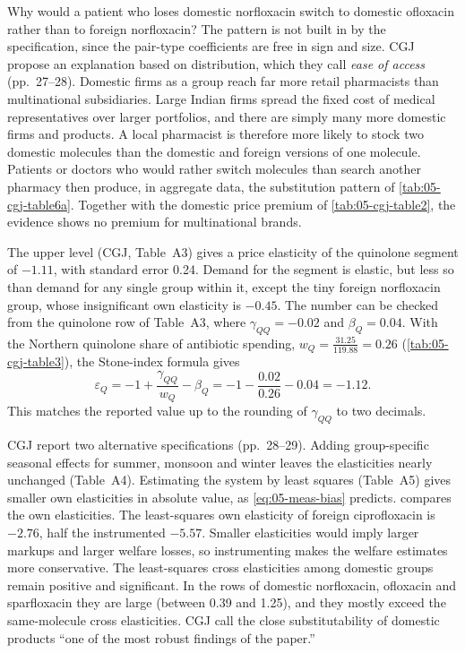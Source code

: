  Why would a patient who loses domestic norfloxacin switch to domestic ofloxacin rather
than to foreign norfloxacin? The pattern is not built in by the specification, since the pair-type coefficients are
free in sign and size. CGJ propose an explanation based on distribution, which they call \emph{ease of access}
(pp.~27--28). Domestic firms as a group reach far more retail pharmacists than multinational subsidiaries. Large
Indian firms spread the fixed cost of medical representatives over larger portfolios, and there are simply many more
domestic firms and products. A local pharmacist is therefore more likely to stock two domestic molecules than the
domestic and foreign versions of one molecule. Patients or doctors who would rather switch molecules than search
another pharmacy then produce, in aggregate data, the substitution pattern of \cref{tab:05-cgj-table6a}. Together with
the domestic price premium of \cref{tab:05-cgj-table2}, the evidence shows no premium for multinational brands.

 The upper level (CGJ, Table~A3) gives a price elasticity of the quinolone segment
of $-1.11$, with standard error 0.24. Demand for the segment is elastic, but less so than demand for any single group
within it, except the tiny foreign norfloxacin group, whose insignificant own elasticity is $-0.45$. The number can be checked from the quinolone row of Table~A3, where $\gamma_{QQ} = -0.02$ and $\beta_Q =
0.04$. With the Northern quinolone share of antibiotic spending, $w_Q = \frac{31.25}{119.88} = 0.26$
(\cref{tab:05-cgj-table3}), the Stone-index formula gives
\begin{equation*}
\varepsilon_Q = -1 + \frac{\gamma_{QQ}}{w_Q} - \beta_Q = -1 - \frac{0.02}{0.26} - 0.04 = -1.12 .
\end{equation*}
This matches the reported value up to the rounding of $\gamma_{QQ}$ to two decimals.

 CGJ report two alternative specifications (pp.~28--29). Adding group-specific seasonal effects
for summer, monsoon and winter leaves the elasticities nearly unchanged (Table~A4). Estimating the system by least
squares (Table~A5) gives smaller own elasticities in absolute value, as \eqref{eq:05-meas-bias} predicts.
 compares the own elasticities. The least-squares own elasticity of foreign ciprofloxacin is
$-2.76$, half the instrumented $-5.57$. Smaller elasticities would imply larger markups and larger welfare losses, so
instrumenting makes the welfare estimates more conservative. The least-squares cross elasticities among domestic
groups remain positive and significant. In the rows of domestic norfloxacin, ofloxacin and sparfloxacin they are
large (between 0.39 and 1.25), and they mostly exceed the same-molecule cross elasticities. CGJ call the close substitutability of domestic products ``one of the most robust findings of the
paper.''

